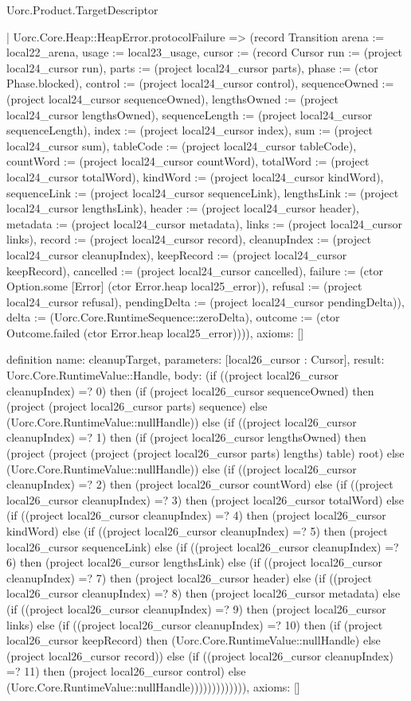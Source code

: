 \begin{lexlean}{Uorc.Product.TargetDescriptor}
\begin{semanticmodule}
{    | Uorc.Core.Heap::HeapError.protocolFailure => (record Transition {arena := local22_arena, usage := local23_usage, cursor := (record Cursor {run := (project local24_cursor run), parts := (project local24_cursor parts), phase := (ctor Phase.blocked), control := (project local24_cursor control), sequenceOwned := (project local24_cursor sequenceOwned), lengthsOwned := (project local24_cursor lengthsOwned), sequenceLength := (project local24_cursor sequenceLength), index := (project local24_cursor index), sum := (project local24_cursor sum), tableCode := (project local24_cursor tableCode), countWord := (project local24_cursor countWord), totalWord := (project local24_cursor totalWord), kindWord := (project local24_cursor kindWord), sequenceLink := (project local24_cursor sequenceLink), lengthsLink := (project local24_cursor lengthsLink), header := (project local24_cursor header), metadata := (project local24_cursor metadata), links := (project local24_cursor links), record := (project local24_cursor record), cleanupIndex := (project local24_cursor cleanupIndex), keepRecord := (project local24_cursor keepRecord), cancelled := (project local24_cursor cancelled), failure := (ctor Option.some [Error] (ctor Error.heap local25_error)), refusal := (project local24_cursor refusal), pendingDelta := (project local24_cursor pendingDelta)}), delta := (Uorc.Core.RuntimeSequence::zeroDelta), outcome := (ctor Outcome.failed (ctor Error.heap local25_error))})),
  axioms: []
}

definition{
  name: cleanupTarget,
  parameters: [local26_cursor : Cursor],
  result: Uorc.Core.RuntimeValue::Handle,
  body: (if ((project local26_cursor cleanupIndex) =? 0) then (if (project local26_cursor sequenceOwned) then (project (project local26_cursor parts) sequence) else (Uorc.Core.RuntimeValue::nullHandle)) else (if ((project local26_cursor cleanupIndex) =? 1) then (if (project local26_cursor lengthsOwned) then (project (project (project (project local26_cursor parts) lengths) table) root) else (Uorc.Core.RuntimeValue::nullHandle)) else (if ((project local26_cursor cleanupIndex) =? 2) then (project local26_cursor countWord) else (if ((project local26_cursor cleanupIndex) =? 3) then (project local26_cursor totalWord) else (if ((project local26_cursor cleanupIndex) =? 4) then (project local26_cursor kindWord) else (if ((project local26_cursor cleanupIndex) =? 5) then (project local26_cursor sequenceLink) else (if ((project local26_cursor cleanupIndex) =? 6) then (project local26_cursor lengthsLink) else (if ((project local26_cursor cleanupIndex) =? 7) then (project local26_cursor header) else (if ((project local26_cursor cleanupIndex) =? 8) then (project local26_cursor metadata) else (if ((project local26_cursor cleanupIndex) =? 9) then (project local26_cursor links) else (if ((project local26_cursor cleanupIndex) =? 10) then (if (project local26_cursor keepRecord) then (Uorc.Core.RuntimeValue::nullHandle) else (project local26_cursor record)) else (if ((project local26_cursor cleanupIndex) =? 11) then (project local26_cursor control) else (Uorc.Core.RuntimeValue::nullHandle))))))))))))),
  axioms: []
}


\end{semanticmodule}
\end{lexlean}
